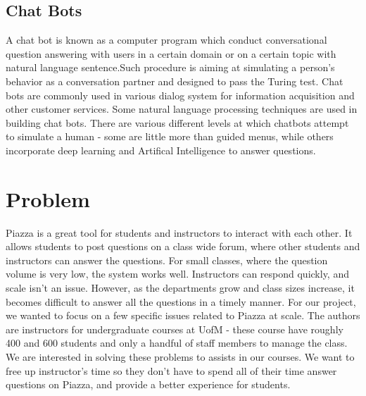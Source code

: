 \documentclass[sigconf]{acmart}
\begin{document}
\subsection{Chat Bots}
A chat bot is known as a computer program which conduct conversational question answering  with users in a certain domain or on a certain topic with natural language sentence.Such procedure is aiming at simulating a person’s behavior as a conversation partner and designed to pass the Turing test. Chat bots are commonly used in various dialog system for information acquisition and other customer services. Some natural language processing techniques are used in building chat bots. There are various different levels at which chatbots attempt to simulate a human - some are little more than guided menus, while others incorporate deep learning and Artifical Intelligence to answer questions.


\section{Problem}
Piazza is a great tool for students and instructors to interact with each other. It allows students to post questions on a class wide forum, where other students and instructors can answer the questions. For small classes, where the question volume is very low, the system works well. Instructors can respond quickly, and scale isn't an issue. However, as the departments grow and class sizes increase, it becomes difficult to answer all the questions in a timely manner. For our project, we wanted to focus on a few specific issues related to Piazza at scale. The authors are instructors for undergraduate courses at UofM - these course have roughly 400 and 600 students and only a handful of staff members to manage the class. We are interested in solving these problems to assists in our courses. We want to free up instructor's time so they don't have to spend all of their time answer questions on Piazza, and provide a better experience for students.
\end{document}
